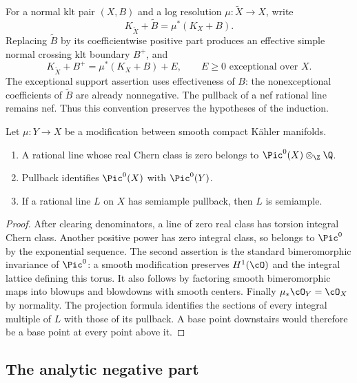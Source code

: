 For a normal klt pair \((X,B)\) and a log resolution \(\mu:\widetilde X\to X\),
write
\[
 K_{\widetilde X}+\widetilde B=\mu^*(K_X+B).
\]
Replacing \(\widetilde B\) by its coefficientwise positive part produces
an effective simple normal crossing klt boundary \(B^+\), and
\begin{equation}\label{pre:resolution-error}
 K_{\widetilde X}+B^+=\mu^*(K_X+B)+E,
 \qquad E\geq0\text{ exceptional over }X.
\end{equation}
The exceptional support assertion uses effectiveness of \(B\): the
nonexceptional coefficients of \(\widetilde B\) are already nonnegative.
The pullback of a nef rational line remains nef. Thus this convention
preserves the hypotheses of the induction.

\begin{lemma}\label{pre:picard}
Let \(\mu:Y\to X\) be a modification between smooth compact K\"ahler
manifolds.
\begin{enumerate}
\item A rational line whose real Chern class is zero belongs to
\(\Pic^0(X)\otimes_{\Z}\Q\).
\item Pullback identifies \(\Pic^0(X)\) with \(\Pic^0(Y)\).
\item If a rational line \(L\) on \(X\) has semiample pullback, then \(L\)
is semiample.
\end{enumerate}
\end{lemma}
\begin{proof}
After clearing denominators, a line of zero real class has torsion
integral Chern class. Another positive power has zero integral class,
so belongs to \(\Pic^0\) by the exponential sequence.
The second assertion is the standard bimeromorphic invariance of
\(\Pic^0\): a smooth modification preserves \(H^1(\cO)\) and the
integral lattice defining this torus. It also follows by factoring
smooth bimeromorphic maps into blowups and blowdowns with smooth centers.
Finally \(\mu_*\cO_Y=\cO_X\) by normality. The projection formula identifies
the sections of every integral multiple of \(L\) with those of its
pullback. A base point downstairs would therefore be a base point at
every point above it.
\end{proof}

\subsection{The analytic negative part}

